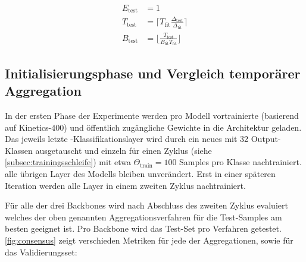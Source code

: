 \begin{equation}
    \label{eq:eval-dims-pool}
    \begin{split}
    E_\text{test}           & = 1 \\
    T_\text{test}           & = \lceil T_\text{fit} \frac{\Delta_\text{test}}{\Delta_\text{fit}} \rceil \\
    B_\text{test}           & = \lfloor \frac{T_\text{test} }{B_\text{fit} T_\text{fit}} \rfloor
    \end{split}
\end{equation}

\subsection{Initialisierungsphase und Vergleich temporärer Aggregation}
\label{subsec:initialisierungsphase}

In der ersten Phase der Experimente werden pro Modell vortrainierte (basierend auf Kinetics-400) und öffentlich zugängliche Gewichte in die Architektur geladen.
Das jeweils letzte \fc-Klassifikationslayer wird durch ein neues mit 32 Output-Klassen ausgetauscht und einzeln für einen Zyklus (siehe \autoref{subsec:trainingsschleife}) mit etwa $\Theta_\text{train} = 100$ Samples pro Klasse nachtrainiert.
\Dh alle übrigen Layer des Modells bleiben unverändert.
Erst in einer späteren Iteration werden alle Layer in einem zweiten Zyklus nachtrainiert.

Für alle der drei Backbones wird nach Abschluss des zweiten Zyklus evaluiert welches der oben genannten Aggregationsverfahren für die Test-Samples am besten geeignet ist.
Pro Backbone wird das Test-Set pro Verfahren getestet.
\autoref{fig:consensus} zeigt verschieden Metriken für jede der Aggregationen, sowie für das Validierungsset:

